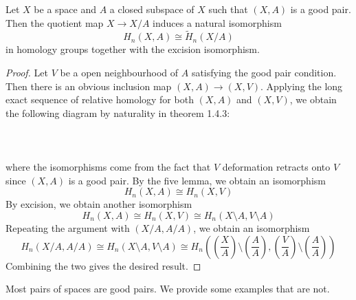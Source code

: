 \documentclass[a4paper]{article}
\begin{document}
\begin{prp}{}{} Let $X$ be a space and $A$ a closed subspace of $X$ such that $(X,A)$ is a good pair. Then the quotient map $X\to X/A$ induces a natural isomorphism $$H_n(X,A)\cong\widetilde{H}_n(X/A)$$ in homology groups together with the excision isomorphism. \tcbline
\begin{proof}
Let $V$ be a open neighbourhood of $A$ satisfying the good pair condition. Then there is an obvious inclusion map $(X,A)\to(X,V)$. Applying the long exact sequence of relative homology for both $(X,A)$ and $(X,V)$, we obtain the following diagram by naturality in theorem 1.4.3: \\~\\
\\~\\
where the isomorphisms come from the fact that $V$ deformation retracts onto $V$ since $(X,A)$ is a good pair. By the five lemma, we obtain an isomorphism $$H_n(X,A)\cong H_n(X,V)$$ By excision, we obtain another isomorphism $$H_n(X,A)\cong H_n(X,V)\cong H_n(X\setminus A,V\setminus A)$$ Repeating the argument with $(X/A,A/A)$, we obtain an isomorphism $$H_n(X/A,A/A)\cong H_n(X\setminus A,V\setminus A)\cong H_n\left(\left(\frac{X}{A}\right)\setminus\left(\frac{A}{A}\right),\left(\frac{V}{A}\right)\setminus\left(\frac{A}{A}\right)\right)$$ Combining the two gives the desired result. 
\end{proof}
\end{prp}

Most pairs of spaces are good pairs. We provide some examples that are not. \\~\\
\end{document}
